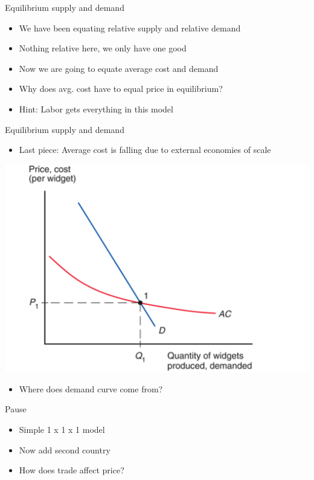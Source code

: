 \documentclass[ignorenonframetext,]{beamer}
\begin{document}
\begin{frame}{Equilibrium supply and demand}

    \begin{itemize}
        \item We have been equating relative supply and relative demand
        \item Nothing relative here, we only have one good
        \item Now we are going to equate average cost and demand
        \item Why does avg. cost have to equal price in equilibrium?
        \item Hint: Labor gets everything in this model
    \end{itemize}
    
\end{frame} 
\begin{frame}{Equilibrium supply and demand}

    \begin{itemize}
        \item Last piece: Average cost is falling due to external economies of scale
    \end{itemize}
    \includegraphics[scale=0.20]{ext_equil.png}
    \begin{itemize}
        \item Where does demand curve come from?
    \end{itemize}

\end{frame}

\begin{frame}{Pause}

    \begin{itemize}
        \item Simple 1 x 1 x 1 model
        \item Now add second country
        \item How does trade affect price?
    \end{itemize}

\end{frame}
\end{document}
